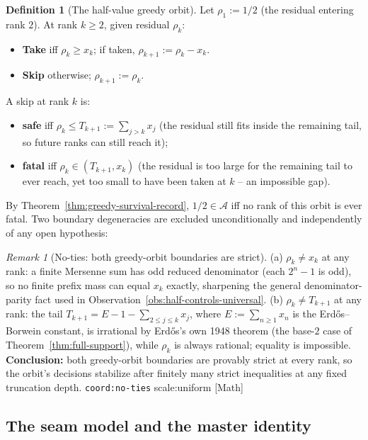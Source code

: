 \documentclass[11pt]{article}
\theoremstyle{plain}
\theoremstyle{definition}
\newtheorem{defn}[thm]{Definition}
\theoremstyle{remark}
\newtheorem{rem}[thm]{Remark}
\newcommand{\ev}[1]{{\small\textsf{[#1]}}\xspace}
\newcommand{\scale}[1]{{\small\textsf{scale:#1}}\xspace}
\newcommand{\coord}[1]{\texorpdfstring{{\small\nolinkurl{coord:#1}}}{coord:#1}\xspace}
\begin{document}
\begin{defn}[The half-value greedy orbit]
\label{defn:greedy-orbit}
Let $\rho_1 := 1/2$ (the residual entering rank $2$). At rank $k \ge 2$, given residual $\rho_k$:
\begin{itemize}[nosep]
\item \textbf{Take} iff $\rho_k \ge x_k$; if taken, $\rho_{k+1} := \rho_k - x_k$.
\item \textbf{Skip} otherwise; $\rho_{k+1} := \rho_k$.
\end{itemize}
A skip at rank $k$ is:
\begin{itemize}[nosep]
\item \textbf{safe} iff $\rho_k \le T_{k+1} := \sum_{j>k} x_j$ (the residual still fits inside the
remaining tail, so future ranks can still reach it);
\item \textbf{fatal} iff $\rho_k \in (T_{k+1}, x_k)$ (the residual is too large for the remaining
tail to ever reach, yet too small to have been taken at $k$ -- an impossible gap).
\end{itemize}
\end{defn}

By Theorem~\ref{thm:greedy-survival-record}, $1/2 \in \mathcal{A}$ iff no rank of this orbit is ever fatal.
Two boundary degeneracies are excluded unconditionally and independently of any open hypothesis:

\begin{rem}[No-ties: both greedy-orbit boundaries are strict]
\label{rem:no-ties}
(a) $\rho_k \ne x_k$ at any rank: a finite Mersenne sum has odd reduced denominator (each $2^n-1$ is
odd), so no finite prefix mass can equal $x_k$ exactly, sharpening the general
denominator-parity fact used in Observation~\ref{obs:half-controls-universal}.
(b) $\rho_k \ne T_{k+1}$ at any rank: the tail $T_{k+1} = E - 1 - \sum_{2 \le j \le k} x_j$, where
$E := \sum_{n\ge1} x_n$ is the Erd\H{o}s--Borwein constant, is irrational by Erd\H{o}s's own 1948
theorem (the base-$2$ case of Theorem~\ref{thm:full-support}), while $\rho_k$ is always rational;
equality is impossible. \textbf{Conclusion:} both greedy-orbit boundaries are provably strict at
every rank, so the orbit's decisions stabilize after finitely many strict inequalities at any fixed
truncation depth. \coord{no-ties} \scale{uniform} \ev{Math}
\end{rem}

\subsection{The seam model and the master identity}
\label{ssec:seam-model}
\end{document}

